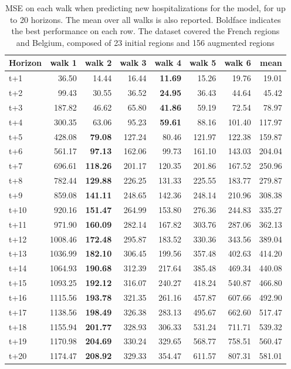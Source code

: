 \begin{table}[H]
\centering
\caption{MSE on each walk when predicting new hospitalizations for the model, for up to 20 horizons. The mean over all walks is also reported. Boldface indicates the best performance on each row. The dataset covered the French regions and Belgium, composed of 23 initial regions and 156 augmented regions }
\label{tab:MSE_walk_baseline}
\begin{tabular}{lrrrrrrr}
\toprule
Horizon &  walk 1 &  walk 2 &  walk 3 &  walk 4 &  walk 5 &  walk 6 &   mean \\
\midrule
t+1  & 36.50  & 14.44  & 16.44  & \textbf{11.69}  & 15.26  & 19.76  & 19.01  \\
t+2  & 99.43  & 30.55  & 36.52  & \textbf{24.95}  & 36.43  & 44.64  & 45.42  \\
t+3  & 187.82  & 46.62  & 65.80  & \textbf{41.86}  & 59.19  & 72.54  & 78.97  \\
t+4  & 300.35  & 63.06  & 95.23  & \textbf{59.61}  & 88.16  & 101.40  & 117.97  \\
t+5  & 428.08  & \textbf{79.08}  & 127.24  & 80.46  & 121.97  & 122.38  & 159.87  \\
t+6  & 561.17  & \textbf{97.13}  & 162.06  & 99.73  & 161.10  & 143.03  & 204.04  \\
t+7  & 696.61  & \textbf{118.26}  & 201.17  & 120.35  & 201.86  & 167.52  & 250.96  \\
t+8  & 782.44  & \textbf{129.88}  & 226.25  & 131.33  & 225.55  & 183.77  & 279.87  \\
t+9  & 859.08  & \textbf{141.11}  & 248.65  & 142.36  & 248.14  & 210.96  & 308.38  \\
t+10  & 920.16  & \textbf{151.47}  & 264.99  & 153.80  & 276.36  & 244.83  & 335.27  \\
t+11  & 971.90  & \textbf{160.09}  & 282.14  & 167.82  & 303.76  & 287.06  & 362.13  \\
t+12  & 1008.46  & \textbf{172.48}  & 295.87  & 183.52  & 330.36  & 343.56  & 389.04  \\
t+13  & 1036.99  & \textbf{182.10}  & 306.45  & 199.56  & 357.48  & 402.63  & 414.20  \\
t+14  & 1064.93  & \textbf{190.68}  & 312.39  & 217.64  & 385.48  & 469.34  & 440.08  \\
t+15  & 1093.25  & \textbf{192.12}  & 316.07  & 240.27  & 418.24  & 540.87  & 466.80  \\
t+16  & 1115.56  & \textbf{193.78}  & 321.35  & 261.16  & 457.87  & 607.66  & 492.90  \\
t+17  & 1138.56  & \textbf{198.49}  & 326.38  & 283.13  & 495.67  & 662.60  & 517.47  \\
t+18  & 1155.94  & \textbf{201.77}  & 328.93  & 306.33  & 531.24  & 711.71  & 539.32  \\
t+19  & 1170.98  & \textbf{204.69}  & 330.24  & 329.65  & 568.77  & 758.51  & 560.47  \\
t+20  & 1174.47  & \textbf{208.92}  & 329.33  & 354.47  & 611.57  & 807.31  & 581.01  \\

\bottomrule
\end{tabular}
\end{table}
